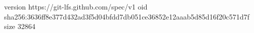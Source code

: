 version https://git-lfs.github.com/spec/v1
oid sha256:3636ff8e377d432ad3f5d04bfdd7db051ce36852e12aaab5d85d16f20c571d7f
size 32864
